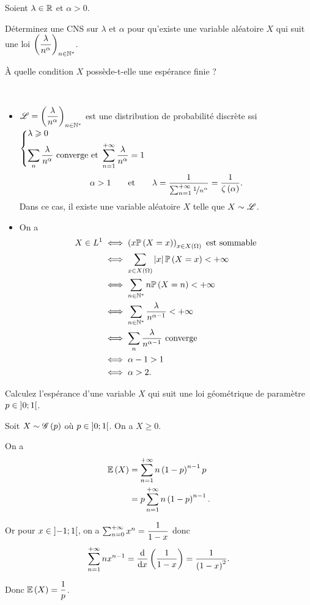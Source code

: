 \begin{exo}
Soient \(\lambda\in\mathbb{R}\) et \(\alpha>0\).

Déterminez une CNS sur \(\lambda\) et \(\alpha\) pour qu'existe une variable aléatoire \(X\) qui suit une loi \(\left(\dfrac{\lambda}{n^\alpha}\right)_{n\in\mathbb{N}^*}\).

À quelle condition \(X\) possède-t-elle une espérance finie ?
\end{exo}

\begin{corr}~\\
\begin{itemize}
    \item \(\mathscr{L}=\left(\dfrac{\lambda}{n^\alpha}\right)_{n\in\mathbb{N}^*}\) est une distribution de probabilité discrète ssi \(\begin{dcases}
        \lambda\geqslant0 \\
        \sum_n\dfrac{\lambda}{n^\alpha}\text{ converge et }\sum_{n=1}^{+\infty}\dfrac{\lambda}{n^\alpha}=1
    \end{dcases}\) \ie \[\alpha>1\qquad\text{et}\qquad\lambda=\dfrac{1}{\sum_{n=1}^{+\infty}\nicefrac{1}{n^\alpha}}=\dfrac{1}{\zeta\left(\alpha\right)}.\] Dans ce cas, il existe une variable aléatoire \(X\) telle que \(X\sim\mathscr{L}\). \\
    \item On a \[\begin{aligned}
        X\in L^1&\iff\left(x\mathbb{P}\left(X=x\right)\right)_{x\in X\left(\Omega\right)}\text{ est sommable} \\
        &\iff\sum_{x\in X\left(\Omega\right)}\left\lvert x\right\rvert\mathbb{P}\left(X=x\right)<+\infty \\
        &\iff\sum_{n\in\mathbb{N}^*}n\mathbb{P}\left(X=n\right)<+\infty \\
        &\iff\sum_{n\in\mathbb{N}^*}\dfrac{\lambda}{n^{\alpha-1}}<+\infty \\
        &\iff\sum_n\dfrac{\lambda}{n^{\alpha-1}}\text{ converge} \\
        &\iff\alpha-1>1 \\
        &\iff\alpha>2.
    \end{aligned}\]
\end{itemize}
\end{corr}

\begin{exo}
Calculez l'espérance d'une variable \(X\) qui suit une loi géométrique de paramètre \(p\in\left]0;1\right[\).
\end{exo}

\begin{corr}
Soit \(X\sim\mathscr{G}\left(p\right)\) où \(p\in\left]0;1\right[\). On a \(X\geq0\).

On a \[\begin{aligned}
\operatorname{\mathbb{E}}\left(X\right)&=\sum_{n=1}^{+\infty}n\left(1-p\right)^{n-1}p \\
&=p\sum_{n=1}^{+\infty}n\left(1-p\right)^{n-1}.
\end{aligned}\]

Or pour \(x\in\left]-1;1\right[\), on a \(\sum_{n=0}^{+\infty}x^n=\dfrac{1}{1-x}\) donc \[\sum_{n=1}^{\pinf}nx^{n-1}=\odv*{\paren{\dfrac{1}{1-x}}}{x}=\dfrac{1}{\paren{1-x}^2}.\]

Donc \(\operatorname{\mathbb{E}}\left(X\right)=\dfrac{1}{p}\).
\end{corr}

